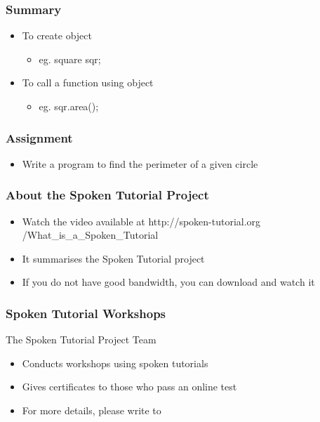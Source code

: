 \documentclass[17pt]{beamer}
\begin{document}
	
\begin{frame}	
\frametitle{Summary}
\begin{itemize}
\item To create object \vspace{.20cm}
\begin{itemize}
\item eg. square sqr; \vspace{.20cm}
\end{itemize}
\item To call a function using object \vspace{.20cm}
\begin{itemize}
\item eg. sqr.area();\vspace{.20cm}
\end{itemize}
\end{itemize}
\end{frame}
	
	
\begin{frame} 
\frametitle{Assignment}
\begin{itemize}
\item Write a program to find the perimeter of a given circle
\end{itemize}
\end{frame}

\begin{frame}
\frametitle{About the Spoken Tutorial Project}
\begin{itemize}
\item Watch the video available at {\color{blue} http://spoken-tutorial.org /What\_is\_a\_Spoken\_Tutorial} 
\item It summarises the Spoken Tutorial project  \pause
\item If you do not have good bandwidth, you can download and watch it
\end{itemize}
\end{frame}

\begin{frame}
\frametitle{Spoken Tutorial Workshops}The Spoken Tutorial Project Team 
\begin{itemize}
\item Conducts workshops using spoken tutorials 
\item Gives certificates to those who pass an online test 
\item For more details, please write to \\ 
\end{itemize}
\end{frame}
\end{document}
